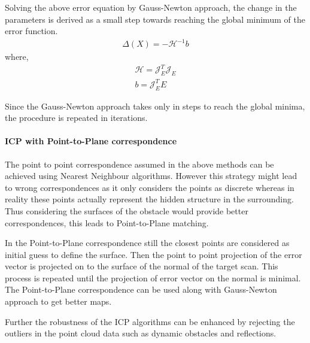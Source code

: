 Solving the above error equation by Gauss-Newton approach, the change in the parameters is derived as a small step towards reaching the global minimum of the error function.
\begin{gather}
    \Delta(X) = -\mathcal{H}^{-1} b
\end{gather}
    where,
\begin{gather}
    \mathcal{H} = \mathcal{J}_E^{T}\mathcal{J}_E\\
    b = \mathcal{J}_E^{T} E
\end{gather}

Since the Gauss-Newton approach takes only in steps to reach the global minima, the procedure is repeated in iterations.
\par
\paragraph{ICP with Point-to-Plane correspondence}
The point to point correspondence assumed in the above methods can be achieved using Nearest Neighbour algorithms. However this strategy might lead to wrong correspondences as it only considers the points as discrete whereas in reality these points actually represent the hidden structure in the surrounding. Thus considering the surfaces of the obstacle would provide better correspondences, this leads to Point-to-Plane matching.
\par
In the Point-to-Plane correspondence still the closest points are considered as initial guess to define the surface. Then the point to point projection of the error vector is projected on to the surface of the normal of the target scan. This process is repeated until the projection of error vector on the normal is minimal. The Point-to-Plane correspondence can be used along with Gauss-Newton approach to get better maps.
\par
Further the robustness of the ICP algorithms can be enhanced by rejecting the outliers in the point cloud data such as dynamic obstacles and reflections.

